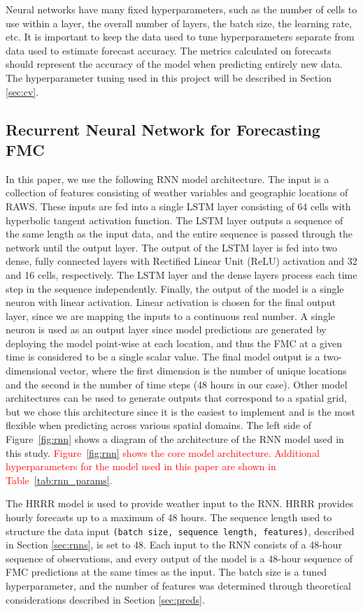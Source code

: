 \documentclass[fire,article,submit,pdftex,moreauthors]{Definitions/mdpi}
\begin{document}
Neural networks have many fixed hyperparameters, such as the number of cells to use within a layer, the overall number of layers, the batch size, the learning rate, etc. It is important to keep the data used to tune hyperparameters separate from data used to estimate forecast accuracy. The metrics calculated on forecasts should represent the accuracy of the model when predicting entirely new data. The hyperparameter tuning used in this project will be described in Section \ref{sec:cv}.

\subsection{Recurrent Neural Network for Forecasting FMC}
\label{sec:model}
In this paper, we use the following RNN model architecture. The input is a collection of features consisting of weather variables and geographic locations of RAWS. These inputs are fed into a single LSTM layer consisting of 64 cells with hyperbolic tangent activation function. The LSTM layer outputs a sequence of the same length as the input data, and the entire sequence is passed through the network until the output layer. The output of the LSTM layer is fed into two dense, fully connected layers with Rectified Linear Unit (ReLU) activation and 32 and 16 cells, respectively. The LSTM layer and the dense layers process each time step in the sequence independently. Finally, the output of the model is a single neuron with linear activation. Linear activation is chosen for the final output layer, since we are mapping the inputs to a continuous real number. A single neuron is used as an output layer since model predictions are generated by deploying the model point-wise at each location, and thus the FMC at a given time is considered to be a single scalar value. The final model output is a two-dimensional vector, where the first dimension is the number of unique locations and the second is the number of time steps (48 hours in our case). Other model architectures can be used to generate outputs that correspond to a spatial grid, but we chose this architecture since it is the easiest to implement and is the most flexible when predicting across various spatial domains. The left side of Figure~\ref{fig:rnn} shows a diagram of the architecture of the RNN model used in this study. \textcolor{red}{Figure~\ref{fig:rnn} shows the core model architecture. Additional hyperparameters for the model used in this paper are shown in Table~\ref{tab:rnn_params}.}

The HRRR model is used to provide weather input to the RNN. HRRR provides hourly forecasts up to a maximum of 48 hours. The sequence length used to structure the data input \texttt{(batch size, sequence length, features)}, described in Section \ref{sec:rnns}, is set to 48. Each input to the RNN consists of a 48-hour sequence of observations, and every output of the model is a 48-hour sequence of FMC predictions at the same times as the input. The batch size is a tuned hyperparameter, and the number of features was determined through theoretical considerations described in Section \ref{sec:preds}. 
\end{document}
